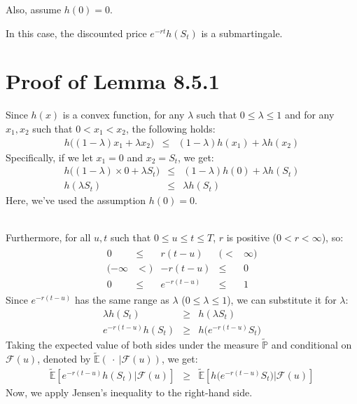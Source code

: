 \documentclass[uplatex,a4j,12pt,dvipdfmx]{jsarticle}
\begin{document}
Also, assume $h(0)=0$.

In this case, the discounted price $e^{-rt} h(S_t)$ is a submartingale.


\section{Proof of Lemma 8.5.1\cite{Shreve2004}}

Since $h(x)$ is a convex function, for any $\lambda$ such that $0 \leq \lambda \leq 1$ and for any $x_1, x_2$ such that $0 < x_1 < x_2$, the following holds:
%
%
\begin{eqnarray*}
	h \Big( (1- \lambda) x_{1} + \lambda x_{2} \Big)
	&\leq&
	(1- \lambda) h(x_1) + \lambda h(x_{2})
\end{eqnarray*}
%
%
Specifically, if we let $x_1=0$ and $x_2=S_t$, we get:
%
%
\begin{eqnarray*}
	h \Big( (1- \lambda) \times 0 + \lambda S_{t} \Big)
	&\leq&
	(1- \lambda) h(0) + \lambda h(S_{t})
	\\
	h ( \lambda S_{t} )
	&\leq&
	\lambda h(S_{t})
\end{eqnarray*}
%
%
Here, we've used the assumption $h(0)=0$.

\ \\

Furthermore, for all $u, t$ such that $0 \leq u \leq t \leq T$, $r$ is positive ($0 < r < \infty$), so:
%
%
\begin{eqnarray*}
	\begin{array}{ccccc}
		0
		 & \leq &
		r(t-u)
		 & ( <  &
		\infty )
		\\
		(
		- \infty
		 & < )  &
		-r(t-u)
		 & \leq &
		0
		\\
		0
		 & \leq &
		e^{-r(t-u)}
		 & \leq &
		1
	\end{array}
\end{eqnarray*}
%
%
Since $e^{-r(t-u)}$ has the same range as $\lambda$ ($0 \leq \lambda \leq 1$), we can substitute it for $\lambda$:
%
%
\begin{eqnarray*}
	\lambda h(S_{t}) &\geq& h ( \lambda S_{t} )
	\\
	e^{-r(t-u)} h(S_{t})
	&\geq&
	h \Big( e^{-r(t-u)} S_{t} \Big)
\end{eqnarray*}
%
%
Taking the expected value of both sides under the measure $\tilde{\mathbb{P}}$ and conditional on $\mathcal{F}(u)$, denoted by $\tilde{\mathbb{E}}( \ \cdot \ | \mathcal{F}(u))$, we get:
%
%
\begin{eqnarray*}
	\tilde{\mathbb{E}} \left[
		e^{-r(t-u)} h(S_{t})
		\Big| \mathcal{F}(u)
		\right]
	&\geq&
	\tilde{\mathbb{E}} \left[
		h \Big( e^{-r(t-u)} S_{t} \Big)
		\Big|
		\mathcal{F}(u) \right]
\end{eqnarray*}
%
%
Now, we apply Jensen's inequality to the right-hand side.
\end{document}
